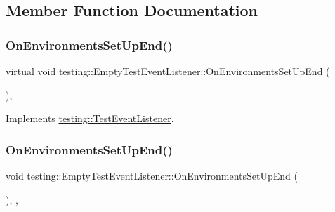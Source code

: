 \subsection{Member Function Documentation}
\mbox{\label{classtesting_1_1_empty_test_event_listener_abc481c6648d15d4242245195a06f5aa0}} 
\subsubsection{\texorpdfstring{OnEnvironmentsSetUpEnd()}{OnEnvironmentsSetUpEnd()}\hspace{0.1cm}{\footnotesize\ttfamily [1/3]}}
{\footnotesize\ttfamily virtual void testing\+::\+Empty\+Test\+Event\+Listener\+::\+On\+Environments\+Set\+Up\+End (\begin{DoxyParamCaption}\item[{const \mbox{\hyperlink{classtesting_1_1_unit_test}{Unit\+Test}} \&}]{ }\end{DoxyParamCaption})\hspace{0.3cm}{\ttfamily [inline]}, {\ttfamily [virtual]}}



Implements \mbox{\hyperlink{classtesting_1_1_test_event_listener_aaa1021d75f5dbf3f05c829c1cc520341}{testing\+::\+Test\+Event\+Listener}}.

\mbox{\label{classtesting_1_1_empty_test_event_listener_a9b4e781c0b38065a55c2fd163724ba69}} 
\subsubsection{\texorpdfstring{OnEnvironmentsSetUpEnd()}{OnEnvironmentsSetUpEnd()}\hspace{0.1cm}{\footnotesize\ttfamily [2/3]}}
{\footnotesize\ttfamily void testing\+::\+Empty\+Test\+Event\+Listener\+::\+On\+Environments\+Set\+Up\+End (\begin{DoxyParamCaption}\item[{const \mbox{\hyperlink{classtesting_1_1_unit_test}{Unit\+Test}} \&}]{ }\end{DoxyParamCaption})\hspace{0.3cm}{\ttfamily [inline]}, {\ttfamily [override]}, {\ttfamily [virtual]}}



